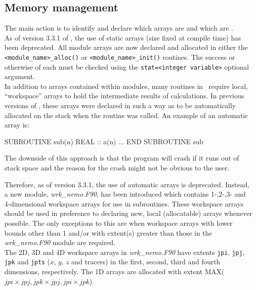 \subsection{Memory management}

The main action is to identify and declare which arrays are  and which are . \\
As of version 3.3.1 of \NEMO, the use of static arrays (size fixed at compile time) has been deprecated.
All module arrays are now declared  and
allocated in either the \texttt{<module\_name>\_alloc()} or \texttt{<module\_name>\_init()} routines.
The success or otherwise of each  must be checked using
the \texttt{stat=<integer\ variable>} optional argument. \\

In addition to arrays contained within modules, many routines in \NEMO\ require local, ``workspace'' arrays to
hold the intermediate results of calculations.
In previous versions of \NEMO, these arrays were declared in such a way as to be automatically allocated on
the stack when the routine was called.
An example of an automatic array is:

\begin{forlines}
SUBROUTINE sub(n)
   REAL :: a(n)
   ...
END SUBROUTINE sub
\end{forlines}

The downside of this approach is that the program will crash if it runs out of stack space and
the reason for the crash might not be obvious to the user.

Therefore, as of version 3.3.1, the use of automatic arrays is deprecated.
Instead, a new module, \textit{wrk\_nemo.F90}, has been introduced which
contains 1-,2-,3- and 4-dimensional workspace arrays for use in subroutines.
These workspace arrays should be used in preference to declaring new, local (allocatable) arrays whenever possible.
The only exceptions to this are when workspace arrays with lower bounds other than 1 and/or
with extent(s) greater than those in the \textit{wrk\_nemo.F90} module are required. \\

The 2D, 3D and 4D workspace arrays in \textit{wrk\_nemo.F90} have extents \texttt{jpi}, \texttt{jpj},
\texttt{jpk} and \texttt{jpts} ($x$, $y$, $z$ and tracers) in the first, second, third and fourth dimensions,
respectively.
The 1D arrays are allocated with extent MAX($jpi \times jpj, jpk \times jpj, jpi \times jpk$). \\

